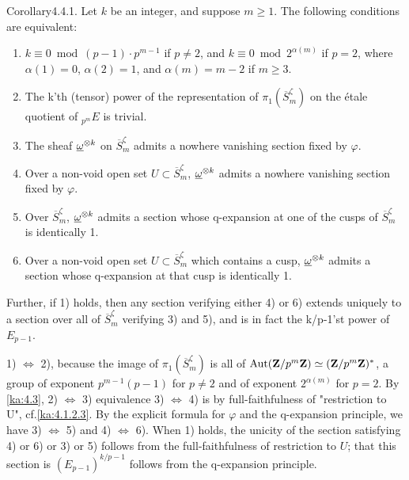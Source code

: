 
\begin{kathm}{Corollary}{4.4.1.}
Let $k$ be an integer, and suppose $m\geq 1$. The following conditions are
equivalent:
\begin{enumerate}
\item[1)] $k\equiv 0 \bmod (p-1)\cdot p^{m-1}$ if $p\neq 2$, and
$k\equiv 0 \bmod 2^{\alpha(m)}$ if $p=2$, where $\alpha(1)=0$, $\alpha(2)=1$, and
$\alpha(m)=m-2$ if $m\geq 3$.
\item[2)] The k'th (tensor) power of the representation of
$\pi_1(\overline{S}_m^\zeta)$ on the \'etale quotient of ${}_{p^m}E$ is trivial.
\item[3)] The sheaf $\underline{\omega}^{\otimes k}$ on $\overline{S}_m^\zeta$ admits a nowhere
vanishing section fixed by $\varphi$.
\item[4)] Over a non-void open set $U\subset\overline{S}_m^\zeta$,
$\underline{\omega}^{\otimes k}$ admits a nowhere vanishing section fixed by $\varphi$.
\item[5)] Over $\overline{S}_m^\zeta$, $\underline{\omega}^{\otimes k}$ admits a section whose
q-expansion at one of the cusps of $\overline{S}_m^\zeta$ is identically 1.
\item[6)] Over a non-void open set $U\subset\overline{S}_m^\zeta$ which contains
a cusp, $\underline{\omega}^{\otimes k}$ admits a section whose q-expansion at that cusp is
identically 1.
\end{enumerate}
Further, if 1) holds, then any section verifying either 4) or 6) extends uniquely
to a section over all of $\overline{S}_m^\zeta$ verifying 3) and 5), and is in
fact the k/p-1'st power of $E_{p-1}$.
\end{kathm}

\begin{kaproof}
1) $\iff$ 2), because the image of $\pi_1(\overline{S}_m^\zeta)$ is all of
$\operatorname{Aut}(\mathbf{Z}/p^m\mathbf{Z})\simeq(\mathbf{Z}/p^m\mathbf{Z})^*$, a group of exponent $p^{m-1}(p-1)$ for
$p\neq 2$ and of exponent $2^{\alpha(m)}$ for $p=2$. By \eqref{ka:4.3}, 2) $\iff$ 3)
equivalence 3) $\iff$ 4) is by full-faithfulness of "restriction to U",
cf.\eqref{ka:4.1.2.3}. By the explicit formula for $\varphi$ and the q-expansion
principle, we have 3) $\iff$ 5) and 4) $\iff$ 6). When 1) holds, the unicity of
the section satisfying 4) or 6) or 3) or 5) follows from the full-faithfulness of
restriction to $U$; that this section is $(E_{p-1})^{k/p-1}$ follows from the
q-expansion principle.
\end{kaproof}

